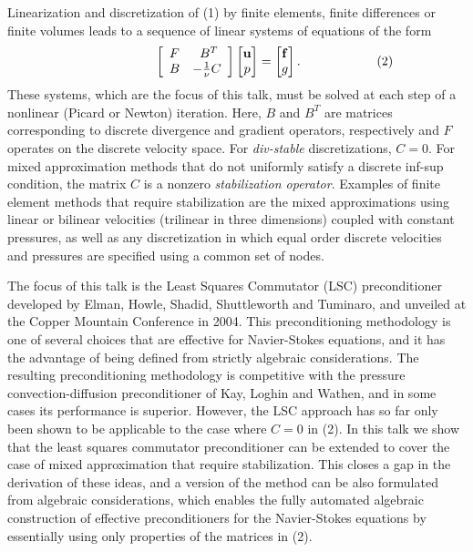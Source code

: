 \documentclass[twosided]{report}
\begin{document}
Linearization and discretization of (1) by finite
elements, finite differences or finite volumes leads to a
sequence of linear systems of equations of the form
$$
\qquad
\qquad
\qquad
\left[
\begin{array}{lc} F & \ B^T \\ B & -\frac{1}{\nu}C
\end{array} \right] \begin{bmatrix} {\bf u}\\ p
\end{bmatrix} = \begin{bmatrix} {\bf f}\\ g \end{bmatrix}.
\qquad
\qquad
\qquad
(2)
$$
These systems, which are the focus of this
talk, must be solved at each step of a nonlinear (Picard or
Newton) iteration. Here, $B$ and $B^T$ are matrices
corresponding to discrete divergence and gradient operators,
respectively and $F$ operates on the discrete velocity
space. For {\em div-stable} discretizations, $C=0$. For
mixed approximation methods that do not uniformly satisfy a
discrete inf-sup condition, the matrix $C$ is a nonzero {\em
stabilization operator}. Examples of finite element methods
that require stabilization are the mixed approximations
using linear or bilinear velocities (trilinear in
three dimensions) coupled with constant pressures, as well
as any discretization in which equal order discrete
velocities and pressures are specified using a common set of
nodes.

The focus of this talk is the Least Squares
Commutator (LSC) preconditioner developed by Elman, Howle,
Shadid, Shuttleworth and Tuminaro, and unveiled at the
Copper Mountain Conference in 2004. This preconditioning
methodology is one of several choices that are effective for
Navier-Stokes equations, and it has the advantage of being
defined from strictly algebraic considerations. The
resulting preconditioning methodology is competitive with
the pressure convection-diffusion preconditioner of Kay,
Loghin and Wathen, and in some cases its performance is
superior. However, the LSC approach has so far only been
shown to be applicable to the case where $C=0$ in
(2). In this talk we show
that the least squares commutator preconditioner can be
extended to cover the case of mixed approximation that
require stabilization. This closes a gap in the derivation
of these ideas, and a version of the method can be also
formulated from algebraic considerations, which enables the
fully automated algebraic construction of effective
preconditioners for the Navier-Stokes equations by
essentially using only properties of the matrices in
(2).
\end{document}
